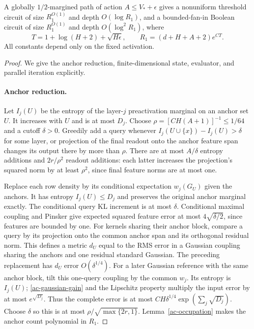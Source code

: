 \begin{theorem}\label{ac-circuits}
A globally $1/2$-margined path of action $A\le V_*+\epsilon$ gives
a nonuniform threshold circuit of size $R_1^{O(1)}$ and depth
$O(\log R_1)$, and a bounded-fan-in Boolean circuit of size
$R_1^{O(1)}$ and depth $O(\log^2R_1)$, where
\[
 T=1+\log(H+2)+\sqrt{H\epsilon},\qquad
 R_1=(d+H+A+2)e^{CT}.
\]
All constants depend only on the fixed activation.
\end{theorem}
\begin{proof}
We give the anchor reduction, finite-dimensional state, evaluator,
and parallel iteration explicitly.

\paragraph{Anchor reduction.}
Let $I_j(U)$ be the entropy of the layer-$j$ preactivation marginal
on an anchor set $U$. It increases with $U$ and is at most $D_j$.
Choose $\rho=[C H(A+1)]^{-1}\le1/64$ and a cutoff $\delta>0$.
Greedily add a query whenever $I_j(U\cup\{x\})-I_j(U)>\delta$
for some layer, or projection of the final readout onto the anchor
feature span changes its output there by more than $\rho$.
There are at most $A/\delta$ entropy additions and $2r/\rho^2$
readout additions: each latter increases the projection's squared
norm by at least $\rho^2$, since final feature norms are at most one.

Replace each row density by its conditional expectation $w_j(G_U)$
given the anchors. It has entropy $I_j(U)\le D_j$ and preserves
the original anchor marginal exactly. The conditional query KL
increment is at most $\delta$. Conditional maximal coupling and
Pinsker give expected squared feature error at most
$4\sqrt{\delta/2}$, since features are bounded by one.
For kernels sharing their anchor block, compare a query by its
projection onto the common anchor span and its orthogonal residual
norm. This defines a metric $d_U$ equal to the RMS error in a Gaussian
coupling sharing the anchors and one residual standard Gaussian.
The preceding replacement has $d_U$ error $O(\delta^{1/4})$.
For a later Gaussian reference with the same anchor block, tilt this
one-query coupling by the common $w_j$. Its entropy is $I_j(U)$;
\eqref{ac-gaussian-gain} and the Lipschitz property multiply the
input error by at most $e^{\sqrt{D_j}}$. Thus the complete error is
at most $CH\delta^{1/4}\exp(\sum_j\sqrt{D_j})$.
Choose $\delta$ so this is at most
$\rho/\sqrt{\max\{2r,1\}}$. Lemma~\ref{ac-occupation} makes
the anchor count polynomial in $R_1$.


\end{proof}
